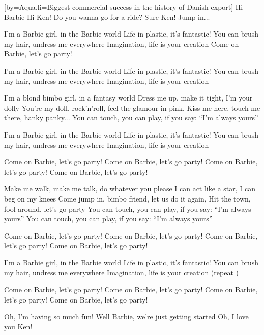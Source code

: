 [by={Aqua},li={Biggest commercial success in the history of Danish export}]
\beginverse
Hi Barbie
Hi Ken!
Do you wanna go for a ride?
Sure Ken!
Jump in...
\endverse

\beginchorus
I'm a Barbie girl, in the Barbie world
Life in plastic, it's fantastic!
You can brush my hair, undress me everywhere
Imagination, life is your creation
Come on Barbie, let's go party!
\endchorus

\beginchorus
I'm a Barbie girl, in the Barbie world
Life in plastic, it's fantastic!
You can brush my hair, undress me everywhere
Imagination, life is your creation
\endchorus

\beginverse
I'm a blond bimbo girl, in a fantasy world
Dress me up, make it tight, I'm your dolly
You're my doll, rock'n'roll, feel the glamour in pink,
Kiss me here, touch me there, hanky panky...
You can touch, you can play, if you say: ``I'm always yours''
\endverse

\beginchorus
I'm a Barbie girl, in the Barbie world
Life in plastic, it's fantastic!
You can brush my hair, undress me everywhere
Imagination, life is your creation
\endchorus

\beginverse
Come on Barbie, let's go party!
Come on Barbie, let's go party!
Come on Barbie, let's go party!
Come on Barbie, let's go party!
\endverse

\beginverse
Make me walk, make me talk, do whatever you please
I can act like a star, I can beg on my knees
Come jump in, bimbo friend, let us do it again,
Hit the town, fool around, let's go party
You can touch, you can play, if you say: ``I'm always yours''
You can touch, you can play, if you say: ``I'm always yours''
\endverse

\beginverse
Come on Barbie, let's go party!
Come on Barbie, let's go party!
Come on Barbie, let's go party!
Come on Barbie, let's go party!
\endverse

\beginchorus
I'm a Barbie girl, in the Barbie world
Life in plastic, it's fantastic!
You can brush my hair, undress me everywhere
Imagination, life is your creation
(repeat )
\endchorus

\beginverse
Come on Barbie, let's go party!
Come on Barbie, let's go party!
Come on Barbie, let's go party!
Come on Barbie, let's go party!
\endverse

\beginverse
Oh, I'm having so much fun!
Well Barbie, we're just getting started
Oh, I love you Ken! 
\endverse
\endsong